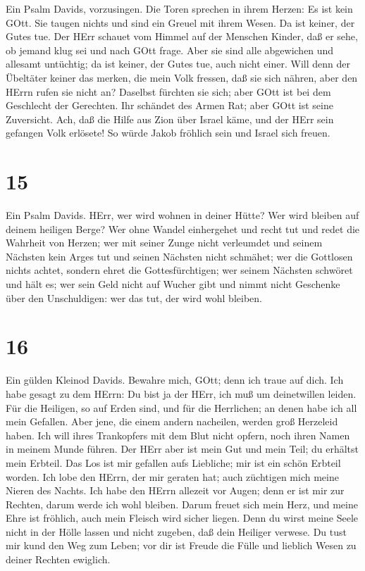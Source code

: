  Ein Psalm Davids, vorzusingen. Die Toren sprechen in ihrem
Herzen: Es ist kein GOtt. Sie taugen nichts und sind ein Greuel mit
ihrem Wesen. Da ist keiner, der Gutes tue.  Der HErr schauet
vom Himmel auf der Menschen Kinder, daß er sehe, ob jemand klug sei und
nach GOtt frage.  Aber sie sind alle abgewichen und allesamt
untüchtig; da ist keiner, der Gutes tue, auch nicht einer. 
Will denn der Übeltäter keiner das merken, die mein Volk fressen, daß
sie sich nähren, aber den HErrn rufen sie nicht an? 
Daselbst fürchten sie sich; aber GOtt ist bei dem Geschlecht der
Gerechten.  Ihr schändet des Armen Rat; aber GOtt ist seine
Zuversicht.  Ach, daß die Hilfe aus Zion über Israel käme,
und der HErr sein gefangen Volk erlösete! So würde Jakob fröhlich sein
und Israel sich freuen.

\hypertarget{section-14}{%
\section{15}\label{section-14}}

 Ein Psalm Davids. HErr, wer wird wohnen in deiner Hütte?
Wer wird bleiben auf deinem heiligen Berge?  Wer ohne Wandel
einhergehet und recht tut und redet die Wahrheit von Herzen;
 wer mit seiner Zunge nicht verleumdet und seinem Nächsten
kein Arges tut und seinen Nächsten nicht schmähet;  wer die
Gottlosen nichts achtet, sondern ehret die Gottesfürchtigen; wer seinem
Nächsten schwöret und hält es;  wer sein Geld nicht auf
Wucher gibt und nimmt nicht Geschenke über den Unschuldigen: wer das
tut, der wird wohl bleiben.

\hypertarget{section-15}{%
\section{16}\label{section-15}}

 Ein gülden Kleinod Davids. Bewahre mich, GOtt; denn ich
traue auf dich.  Ich habe gesagt zu dem HErrn: Du bist ja
der HErr, ich muß um deinetwillen leiden.  Für die Heiligen,
so auf Erden sind, und für die Herrlichen; an denen habe ich all mein
Gefallen.  Aber jene, die einem andern nacheilen, werden
groß Herzeleid haben. Ich will ihres Trankopfers mit dem Blut nicht
opfern, noch ihren Namen in meinem Munde führen.  Der HErr
aber ist mein Gut und mein Teil; du erhältst mein Erbteil. 
Das Los ist mir gefallen aufs Liebliche; mir ist ein schön Erbteil
worden.  Ich lobe den HErrn, der mir geraten hat; auch
züchtigen mich meine Nieren des Nachts.  Ich habe den HErrn
allezeit vor Augen; denn er ist mir zur Rechten, darum werde ich wohl
bleiben.  Darum freuet sich mein Herz, und meine Ehre ist
fröhlich, auch mein Fleisch wird sicher liegen.  Denn du
wirst meine Seele nicht in der Hölle lassen und nicht zugeben, daß dein
Heiliger verwese.  Du tust mir kund den Weg zum Leben; vor
dir ist Freude die Fülle und lieblich Wesen zu deiner Rechten ewiglich.

